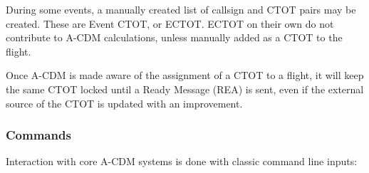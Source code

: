 \documentclass[a4paper,oneside,11pt]{memoir}
\begin{document}
\medskip

During some events, a manually created list of callsign and CTOT pairs may be created. These are Event CTOT, or ECTOT. ECTOT on their own do not contribute to A-CDM calculations, unless manually added as a CTOT to the flight.

\medskip

Once A-CDM is made aware of the assignment of a CTOT to a flight, it will keep the same CTOT locked until a Ready Message (REA) is sent, even if the external source of the CTOT is updated with an improvement. 

\subsubsection{Commands}

Interaction with core A-CDM systems is done with classic command line inputs:
\end{document}
